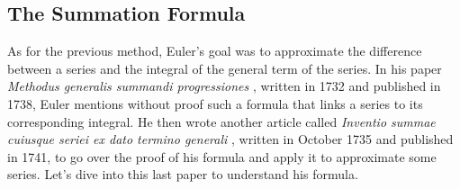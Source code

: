 \subsection*{The Summation Formula}

As for the previous method, Euler's goal was to approximate the difference between a series and the integral of the general term of the series. In his paper \textit{Methodus generalis summandi progressiones} \cite{eulerE25}, written in 1732 and published in 1738, Euler mentions without proof such a formula that links a series to its corresponding integral. He then wrote another article called \textit{Inventio summae cuiusque seriei ex dato termino generali} \cite{eulerE47}, written in October 1735 and published in 1741, to go over the proof of his formula and apply it to approximate some series. Let's dive into this last paper to understand his formula. 

